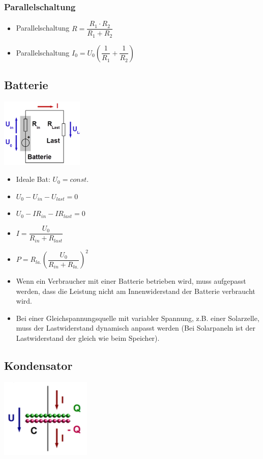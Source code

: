 \documentclass[8pt,a4paper]{scrartcl}
\begin{document}
\begin{multicols*}{3}
				\subsubsection{Parallelschaltung}	
					\begin{itemize}\itemsep0pt
						\item Parallelschaltung $R=\dfrac{R_{1} \cdot R_{2}}{R_{1} + R_{2}}$
						\item Parallelschaltung $I_{0}=U_{0}(\dfrac{1}{R_{1}} + \dfrac{1}{R_{2}})$
					\end{itemize}
			
			
		\subsection{Batterie}
			\begin{multicols*}{2}
				\includegraphics[height=3.3cm]{img/batterie.png} \\
				\begin{itemize}\itemsep0pt
					\item Ideale Bat: $U_{0}=const.$				
					\item $U_{0}-U_{in}-U_{last} =0$
					\item $U_{0}-IR_{in}-IR_{last} =0$
					\item $I=\dfrac{U_{0}}{R_{in}+R_{last}}$
					\item $P=R_{la.}(\dfrac{U_{0}}{R_{in}+R_{la.}})^{2}$
				\end{itemize}
			\end{multicols*}
			\begin{itemize}\itemsep0pt
				\item Wenn ein Verbraucher mit einer Batterie betrieben wird, muss aufgepasst werden, dass die Leistung nicht am Innenwiderstand der Batterie verbraucht wird.
				\item Bei einer Gleichspannungsquelle mit variabler Spannung, z.B. einer Solarzelle, muss der Lastwiderstand dynamisch anpasst werden (Bei Solarpaneln ist der Lastwiderstand der gleich wie beim Speicher).			
			\end{itemize}
			
		\subsection{Kondensator}
			\begin{multicols*}{2}
				\includegraphics[height=3.8cm]{img/kondensator1.png} 
				

\end{multicols*}
\end{multicols*}
\end{document}
